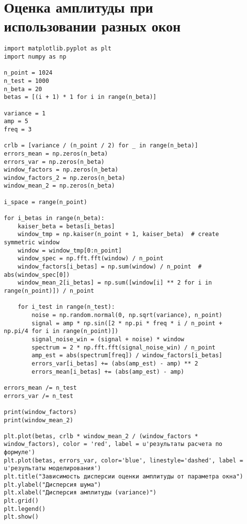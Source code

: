 \chapter{Оценка амплитуды при использовании разных окон}\label{app:Д}
\begin{lstlisting}
import matplotlib.pyplot as plt
import numpy as np

n_point = 1024
n_test = 1000
n_beta = 20
betas = [(i + 1) * 1 for i in range(n_beta)]

variance = 1
amp = 5
freq = 3

crlb = [variance / (n_point / 2) for _ in range(n_beta)]
errors_mean = np.zeros(n_beta)
errors_var = np.zeros(n_beta)
window_factors = np.zeros(n_beta)
window_factors_2 = np.zeros(n_beta)
window_mean_2 = np.zeros(n_beta)

i_space = range(n_point)

for i_betas in range(n_beta):
    kaiser_beta = betas[i_betas]
    window_tmp = np.kaiser(n_point + 1, kaiser_beta)  # create symmetric window
    window = window_tmp[0:n_point]
    window_spec = np.fft.fft(window) / n_point
    window_factors[i_betas] = np.sum(window) / n_point  # abs(window_spec[0])
    window_mean_2[i_betas] = np.sum([window[i] ** 2 for i in range(n_point)]) / n_point

    for i_test in range(n_test):
        noise = np.random.normal(0, np.sqrt(variance), n_point)
        signal = amp * np.sin([2 * np.pi * freq * i / n_point + np.pi/4 for i in range(n_point)])
        signal_noise_win = (signal + noise) * window
        spectrum = 2 * np.fft.fft(signal_noise_win) / n_point
        amp_est = abs(spectrum[freq]) / window_factors[i_betas]
        errors_var[i_betas] += (abs(amp_est) - amp) ** 2
        errors_mean[i_betas] += (abs(amp_est) - amp)

errors_mean /= n_test
errors_var /= n_test

print(window_factors)
print(window_mean_2)

plt.plot(betas, crlb * window_mean_2 / (window_factors * window_factors), color = 'red', label = u'результаты расчета по формуле')
plt.plot(betas, errors_var, color='blue', linestyle='dashed', label = u'результаты моделирования')
plt.title("Зависимость дисперсии оценки амплитуды от параметра окна")
plt.ylabel("Дисперсия шума")
plt.xlabel("Дисперсия амплитуды (variance)")
plt.grid()
plt.legend()
plt.show()
\end{lstlisting}

